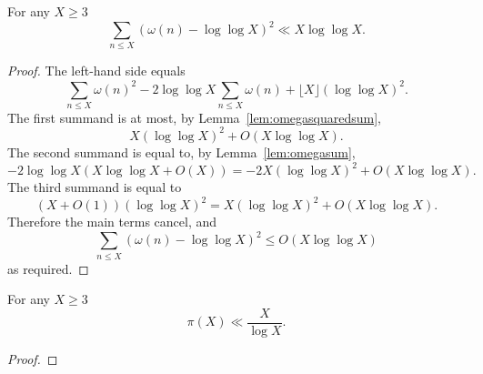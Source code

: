 \begin{lemma}\label{lem:turan}
  \leanok
For any $X\geq 3$
\[\sum_{n\leq X}(\omega(n) - \log\log X)^2 \ll X\log\log X.\]
\end{lemma}
\begin{proof}
  \leanok
The left-hand side equals
\[\sum_{n\leq X}\omega(n)^2 - 2\log\log X\sum_{n\leq X}\omega(n)+\lfloor X\rfloor (\log\log X)^2.\]
The first summand is at most, by Lemma~\ref{lem:omegasquaredsum},
\[X(\log\log X)^2 +O(X\log\log X).\]
The second summand is equal to, by Lemma~\ref{lem:omegasum},
\[-2\log\log X(X\log\log X+O(X)) = -2X(\log\log X)^2 +O(X\log\log X).\]
The third summand is equal to
\[(X+O(1))(\log\log X)^2 = X(\log\log X)^2 + O(X\log\log X).\]
Therefore the main terms cancel, and
\[\sum_{n\leq X}(\omega(n) - \log\log X)^2\leq O(X\log\log X)\]
as required.
\end{proof}

\begin{lemma}\label{lem:chebyshev}
  \leanok
For any $X\geq 3$
\[\pi(X) \ll \frac{X}{\log X}.\]
\end{lemma}
\begin{proof}
  \leanok
\end{proof}

